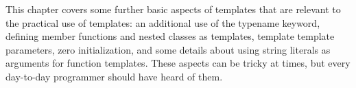 This chapter covers some further basic aspects of templates that are relevant to the practical use of templates: an additional use of the typename keyword, defining member functions and nested classes as templates, template template parameters, zero initialization, and some details about using string literals as arguments for function templates. These aspects can be tricky at times, but every day-to-day programmer should have heard of them.